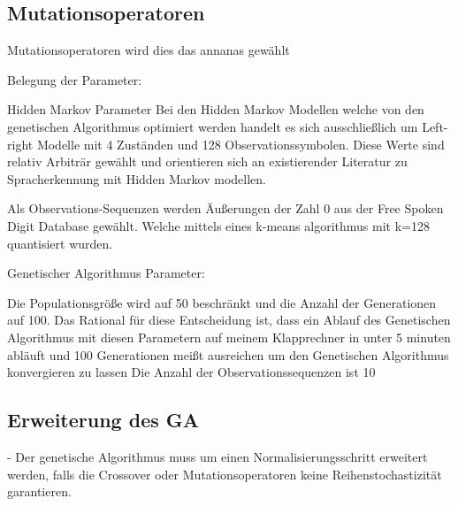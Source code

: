 \subsection*{Mutationsoperatoren}
Mutationsoperatoren wird dies das annanas gewählt


Belegung der Parameter:

Hidden Markov Parameter 
Bei den Hidden Markov Modellen welche von den genetischen Algorithmus optimiert werden handelt es sich 
ausschließlich um Left-right Modelle mit 4 Zuständen und 128 Observationssymbolen.
Diese Werte sind relativ Arbiträr gewählt und orientieren sich an existierender Literatur zu Spracherkennung mit Hidden Markov modellen.

Als Observations-Sequenzen werden Äußerungen der Zahl 0 aus der Free Spoken Digit Database gewählt.
Welche mittels eines k-means algorithmus mit k=128 quantisiert wurden.


Genetischer Algorithmus Parameter:

Die Populationsgröße wird auf 50 beschränkt und die Anzahl der Generationen auf 100.
Das Rational für diese Entscheidung ist, dass ein Ablauf des Genetischen Algorithmus mit diesen Parametern
auf meinem Klapprechner in unter 5 minuten abläuft und 100 Generationen meißt ausreichen um den Genetischen Algorithmus konvergieren zu lassen
Die Anzahl der Observationssequenzen ist 10


\subsection*{Erweiterung des GA}
- Der genetische Algorithmus muss um einen Normalisierungsschritt erweitert werden, 
falls die Crossover oder Mutationsoperatoren keine Reihenstochastizität garantieren.